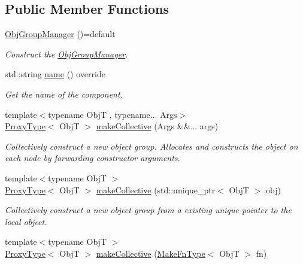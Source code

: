 \subsection*{Public Member Functions}
\begin{DoxyCompactItemize}
\item 
\hyperlink{structvt_1_1objgroup_1_1_obj_group_manager_a2de45aef25bff09a2fafabe227aa0ee7}{Obj\+Group\+Manager} ()=default
\begin{DoxyCompactList}\small\item\em Construct the \hyperlink{structvt_1_1objgroup_1_1_obj_group_manager}{Obj\+Group\+Manager}. \end{DoxyCompactList}\item 
std\+::string \hyperlink{structvt_1_1objgroup_1_1_obj_group_manager_a92c0b07c2d90063c40087f625880cca3}{name} () override
\begin{DoxyCompactList}\small\item\em Get the name of the component. \end{DoxyCompactList}\item 
{\footnotesize template$<$typename ObjT , typename... Args$>$ }\\\hyperlink{structvt_1_1objgroup_1_1_obj_group_manager_aea65eef52f240a52210132eef5ce591f}{Proxy\+Type}$<$ ObjT $>$ \hyperlink{structvt_1_1objgroup_1_1_obj_group_manager_a651c44a47c6bcdc9f1b6c9e857fa03f2}{make\+Collective} (Args \&\&... args)
\begin{DoxyCompactList}\small\item\em Collectively construct a new object group. Allocates and constructs the object on each node by forwarding constructor arguments. \end{DoxyCompactList}\item 
{\footnotesize template$<$typename ObjT $>$ }\\\hyperlink{structvt_1_1objgroup_1_1_obj_group_manager_aea65eef52f240a52210132eef5ce591f}{Proxy\+Type}$<$ ObjT $>$ \hyperlink{structvt_1_1objgroup_1_1_obj_group_manager_ac1c2489611d2064b89b65b90059b2c4b}{make\+Collective} (std\+::unique\+\_\+ptr$<$ ObjT $>$ obj)
\begin{DoxyCompactList}\small\item\em Collectively construct a new object group from a existing unique pointer to the local object. \end{DoxyCompactList}\item 
{\footnotesize template$<$typename ObjT $>$ }\\\hyperlink{structvt_1_1objgroup_1_1_obj_group_manager_aea65eef52f240a52210132eef5ce591f}{Proxy\+Type}$<$ ObjT $>$ \hyperlink{structvt_1_1objgroup_1_1_obj_group_manager_a34d75d825c84636cd9c13f6185243414}{make\+Collective} (\hyperlink{structvt_1_1objgroup_1_1_obj_group_manager_a397d787b3876752a6d70511b2769b872}{Make\+Fn\+Type}$<$ ObjT $>$ fn)

\end{DoxyCompactItemize}
